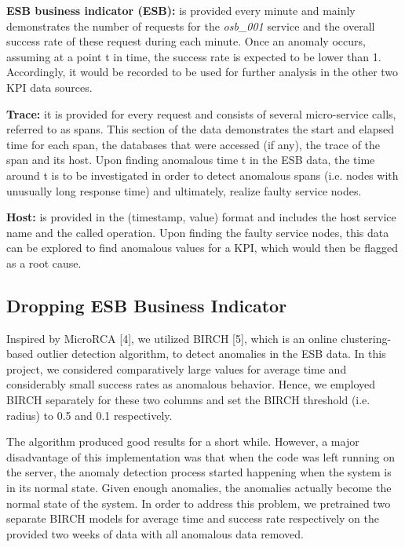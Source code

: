 \documentclass[12pt]{article}
\begin{document}
\smallskip\smallskip
\noindent \textbf{ESB business indicator (ESB): }is provided every minute and mainly demonstrates the number of requests for the \textit{osb\_001} service and the overall success rate of these request during each minute. Once an anomaly occurs, assuming at a point t in time, the success rate is expected to be lower than 1. Accordingly, it would be recorded to be used for further analysis in the other two KPI data sources.

\smallskip
\noindent \textbf{Trace: }it is provided for every request and consists of several micro-service calls, referred to as spans. This section of the data demonstrates the start and elapsed time for each span, the databases that were accessed (if any), the trace of the span and its host. Upon finding anomalous time t in the ESB data, the time around t is to be investigated in order to detect anomalous spans (i.e. nodes with unusually long response time) and ultimately, realize faulty service nodes. 

\smallskip
\noindent \textbf{Host: }is provided in the (timestamp, value) format and includes the host service name and the called operation. Upon finding the faulty service nodes, this data can be explored to find anomalous values for a KPI, which would then be flagged as a root cause.

\subsection{Dropping ESB Business Indicator}
\smallskip
\smallskip
\noindent Inspired by MicroRCA [4], we utilized BIRCH [5], which is an online clustering-based outlier detection algorithm, to detect anomalies in the ESB data. In this project, we considered comparatively large values for average time and considerably small success rates as anomalous behavior. Hence, we employed BIRCH separately for these two columns and set the BIRCH threshold (i.e. radius) to 0.5 and 0.1 respectively. 


\noindent The algorithm produced good results for a short while. However, a major disadvantage of this implementation was that when the code was left running on the server, the anomaly detection process started happening when the system is in its normal state. Given enough anomalies, the anomalies actually become the normal state of the system. In order to address this problem, we pretrained two separate BIRCH models for average time and success rate respectively on the provided two weeks of data with all anomalous data removed.
\end{document}
